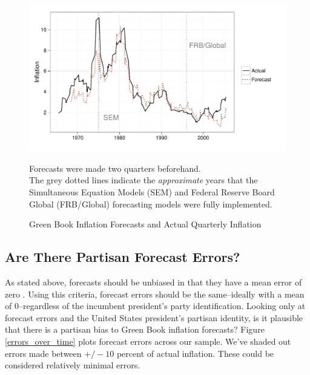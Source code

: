 \documentclass[a4paper]{article}\usepackage{graphicx, color}
\newenvironment{knitrout}{}{} %
\begin{document}
\begin{figure}[t]
    \caption{Green Book Inflation Forecasts and Actual Quarterly Inflation}
    \label{absolute}
    \begin{center}
    
\begin{knitrout}
\color{fgcolor}\includegraphics[width=0.8\linewidth]{figure/BaseInflation} 
\end{knitrout}

    
    \end{center}
    \begin{singlespace}
        {\scriptsize{Forecasts were made two quarters beforehand. \\
                     The grey dotted lines indicate the {\emph{approximate}} years that the Simultaneous Equation Models (SEM) and Federal Reserve Board Global (FRB/Global) forecasting models were fully implemented.  
                      }}
    \end{singlespace}
\end{figure}


\subsection{Are There Partisan Forecast Errors?}

As stated above, forecasts should be unbiased in that they have a mean error of zero \citep[5]{Bruck2006}. Using this criteria, forecast errors should be the same--ideally with a mean of 0--regardless of the incumbent president's party identification. Looking only at forecast errors and the United States president's partisan identity, is it plausible that there is a partisan bias to Green Book inflation forecasts? Figure \ref{errors_over_time} plots forecast errors across our sample. We've shaded out errors made between $+/- 10$ percent of actual inflation. These could be considered relatively minimal errors. 
\end{document}
